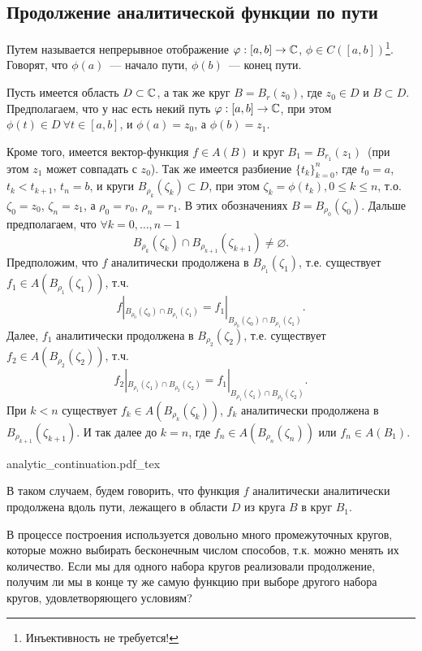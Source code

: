 \documentclass[main]{subfiles}
\begin{document}
\subsection{Продолжение аналитической функции по пути}
\begin{definition}
    Путем называется непрерывное отображение $\varphi: [a,b] \to \mathbb{C}$, $\phi \in C([a,b])$\footnote{Инъективность не требуется!}.
    Говорят, что $\phi(a)$~--- начало пути, $\phi(b)$~--- конец пути.
\end{definition}
\begin{definition}
    Пусть имеется область $D \subset \mathbb{C}$, а так же круг $B = B_r(z_0)$, где $z_0 \in D$ и $B \subset D$.
    Предполагаем, что у нас есть некий путь $\varphi: [a,b] \to \mathbb{C}$, при этом $\phi(t) \in D\ \forall t \in [a,b]$, и $\phi(a) = z_0$, а $\phi(b) = z_1$.

    Кроме того, имеется вектор-функция $f \in A(B)$ и круг $B_1 = B_{r_1}(z_1)$~(при этом $z_1$ может совпадать с $z_0$).
    Так же имеется разбиение $\{t_k\}_{k=0}^n$, где $t_0 = a$, $t_k < t_{k+1}$, $t_n =b$, и круги $B_{\rho_k}(\zeta_k) \subset D$, при этом $\zeta_k = \phi(t_k), 0 \le k \le n$, т.о. $\zeta_0 = z_0$, $\zeta_n = z_1$, а $\rho_0 = r_0$, $\rho_n = r_1$.
    В этих обозначениях $B = B_{\rho_0}(\zeta_0)$.
    Дальше предполагаем, что $\forall k = 0, \dotsc, n-1$
    \[B_{\rho_k}(\zeta_k) \cap B_{\rho_{k+1}}(\zeta_{k+1}) \neq \varnothing. \]
    Предположим, что $f$ аналитически продолжена в $B_{\rho_1}(\zeta_1)$, т.е. существует $f_1 \in A(B_{\rho_1}(\zeta_1))$, т.ч.
    \[f|_{B_{\rho_0}(\zeta_0) \cap B_{\rho_{1}}(\zeta_{1})} = f_1|_{B_{\rho_0}(\zeta_0) \cap B_{\rho_{1}}(\zeta_{1})}.\]
    Далее, $f_1$ аналитически продолжена в $B_{\rho_2}(\zeta_2)$, т.е. существует $f_2 \in A(B_{\rho_2}(\zeta_2))$, т.ч.
    \[f_2|_{B_{\rho_1}(\zeta_1) \cap B_{\rho_{2}}(\zeta_{2})} = f_1|_{B_{\rho_1}(\zeta_1) \cap B_{\rho_{2}}(\zeta_{2})}.\]
    При $k < n$ существует $f_k \in A(B_{\rho_k}(\zeta_k))$, $f_k$ аналитически продолжена в $B_{\rho_{k+1}}(\zeta_{k+1})$.
    И так далее до $k=n$, где $f_n \in A(B_{\rho_n}(\zeta_n))$ или $f_n \in A(B_1)$.
    \begin{center}
        {analytic_continuation.pdf_tex}
    \end{center}
    В таком случаем, будем говорить, что функция $f$ аналитически аналитически продолжена вдоль пути, лежащего в области $D$ из круга $B$ в круг $B_1$.
\end{definition}

В процессе построения используется довольно много промежуточных кругов, которые можно выбирать бесконечным числом способов, т.к. можно менять их количество.
Если мы для одного набора кругов реализовали продолжение, получим ли мы в конце ту же самую функцию при выборе другого набора кругов, удовлетворяющего условиям?
\end{document}
